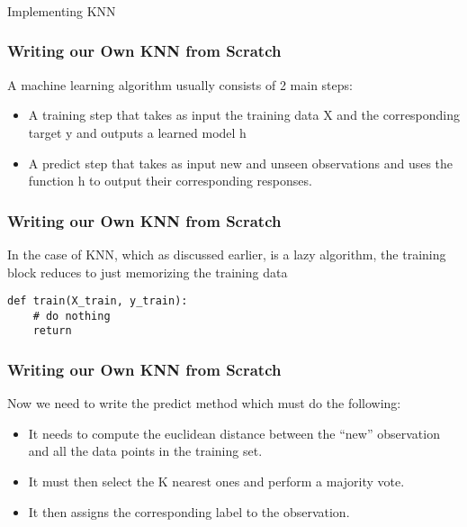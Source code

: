 \begin{frame}[fragile]\frametitle{}
\begin{center}
{\Large Implementing KNN}
\end{center}
\end{frame}


\begin{frame}[fragile]\frametitle{Writing our Own KNN from Scratch}
A machine learning algorithm usually consists of 2 main steps:

\begin{itemize}
\item  A training step that takes as input the training data X and the corresponding target y and outputs a learned model h
\item A predict step that takes as input new and unseen observations and uses the function h
to output their corresponding responses.
\end{itemize}
\end{frame}

\begin{frame}[fragile]\frametitle{Writing our Own KNN from Scratch}
In the case of KNN, which as discussed earlier, is a lazy algorithm, the training block reduces to just memorizing the training data
\begin{lstlisting}
def train(X_train, y_train):
	# do nothing 
	return
\end{lstlisting}
\end{frame}

\begin{frame}[fragile]\frametitle{Writing our Own KNN from Scratch}
Now we need to write the predict method which must do the following:
\begin{itemize}
\item  It needs to compute the euclidean distance between the ``new'' observation and all the data points in the training set. 
\item It must then select the K nearest ones and perform a majority vote. 
\item It then assigns the corresponding label to the observation. 
\end{itemize}
\end{frame}

